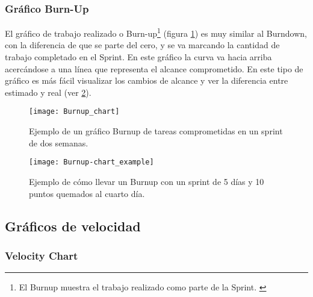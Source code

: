 \subsubsection{Gráfico Burn-Up}

El gráfico de trabajo realizado o Burn-up\footnote{El Burnup muestra el trabajo realizado como parte de la Sprint. \cite{SBOK-2013}} (figura \ref{fig:Burnup_chart}) es muy similar al Burndown, con la diferencia de que se parte del cero, y se va marcando la cantidad de trabajo completado en el Sprint. En este gráfico la curva va hacia arriba acercándose a una línea que representa el alcance comprometido. En este tipo de gráfico es más fácil visualizar los cambios de alcance y ver la diferencia entre estimado y real (ver \ref{fig:Burnup-chart_example}).

\begin{figure}[h]
  \centering
  \texttt{[image: Burnup\_chart]}
  \caption{Ejemplo de un gráfico Burnup de tareas comprometidas en un sprint de dos semanas.}
  \centering
  \label{fig:Burnup_chart} %
\end{figure}
\FloatBarrier %

\begin{figure}[h]
  \centering
  \texttt{[image: Burnup-chart\_example]}
  \caption{Ejemplo de cómo llevar un Burnup con un sprint de 5 días y 10 puntos quemados al cuarto día.}
  \centering
  \label{fig:Burnup-chart_example} %
\end{figure}
\FloatBarrier %

\newpage
\subsection{Gráficos de velocidad}

\subsubsection{Velocity Chart}

